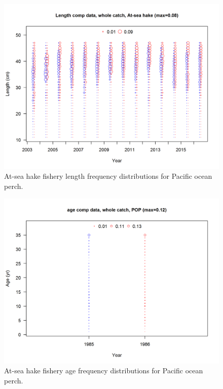\documentclass[12pt,]{article}
\begin{document}
\begin{figure}
\centering
\includegraphics{r4ss/plots_mod1/comp_lendat_bubflt2mkt0.png}
\caption{At-sea hake fishery length frequency distributions for Pacific
ocean perch. \label{fig:ASHOP_Length}}
\end{figure}

\FloatBarrier

\begin{figure}
\centering
\includegraphics{r4ss/plots_mod1/comp_agedat_bubflt2mkt0.png}
\caption{At-sea hake fishery age frequency distributions for Pacific
ocean perch. \label{fig:ASHOP_Age}}
\end{figure}
\end{document}
